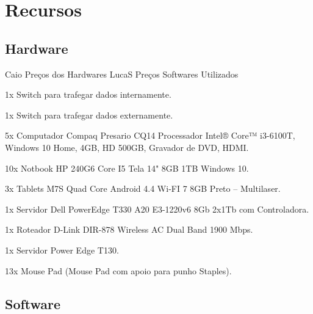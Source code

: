 \chapter[Recursos]{Recursos}

\section[Hardware]{Hardware}

Caio
    Preços dos Hardwares
LucaS 
    Preços Softwares Utilizados
    

\begin{alineas}
    \item 1x Switch para trafegar dados internamente.
    \item 1x Switch para trafegar dados externamente.
    \item 5x Computador Compaq Presario CQ14 Processador Intel® Core™ i3-6100T, Windows 10 Home, 4GB, HD 500GB, Gravador de DVD, HDMI.
    \item 10x Notbook HP 240G6 Core I5 Tela 14" 8GB 1TB Windows 10.
    \item 3x Tablets M7S Quad Core Android 4.4 Wi-FI 7 8GB Preto – Multilaser.
    \item 1x Servidor Dell PowerEdge T330 A20 E3-1220v6 8Gb 2x1Tb com Controladora.
    \item 1x Roteador D-Link DIR-878 Wireless AC Dual Band 1900 Mbps.
    \item 1x Servidor Power Edge T130.
    \item 13x Mouse Pad (Mouse Pad com apoio para punho Staples).
\end{alineas}

\section[Software]{Software}

    

